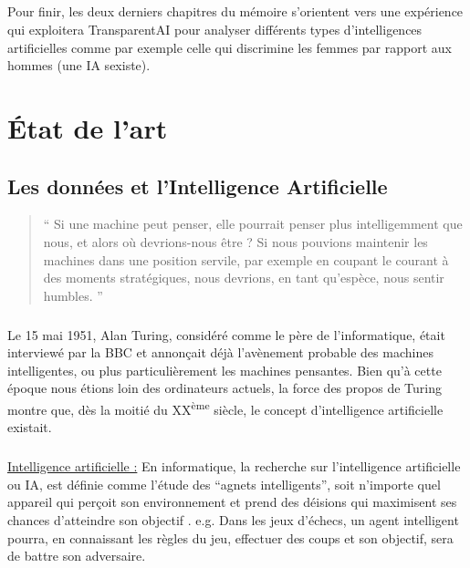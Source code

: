 \documentclass[10pt, french, a4paper]{report}
\begin{document}
\paragraph{}
Pour finir, les deux derniers chapitres du mémoire s'orientent vers une expérience qui exploitera TransparentAI pour analyser différents types d'intelligences artificielles comme par exemple celle qui discrimine les femmes par rapport aux hommes (une IA sexiste). 

\chapter{\uppercase{é}tat de l'art}
\label{chap:etat_art}

\section{Les données et l'Intelligence Artificielle}
\label{sec:ia}

\begin{quotation}
  `` Si une machine peut penser, elle pourrait penser plus intelligemment que nous, et alors où devrions-nous être ? Si nous pouvions maintenir les machines dans une position servile, par exemple en coupant le courant à des moments stratégiques, nous devrions, en tant qu'espèce, nous sentir humbles. ''
\end{quotation}

\paragraph{}
Le 15 mai 1951, Alan Turing, considéré comme le père de l'informatique, était interviewé par la BBC et annonçait déjà l'avènement probable des machines intelligentes, ou plus particulièrement les machines pensantes. Bien qu'à cette époque nous étions loin des ordinateurs actuels, la force des propos de Turing montre que, dès la moitié du XX\textsuperscript{ème} siècle, le concept d'intelligence artificielle existait.

\paragraph{}
\underline{Intelligence artificielle :} En informatique, la recherche sur l'intelligence artificielle ou IA, est définie comme l'étude des ``agnets intelligents'', soit n'importe quel appareil qui perçoit son environnement et prend des déisions qui maximisent ses chances d'atteindre son objectif \citep{poole_computational_1997}. e.g. Dans les jeux d’échecs, un agent intelligent pourra, en connaissant les règles du jeu, effectuer des coups et son objectif, sera de battre son adversaire.
\end{document}
